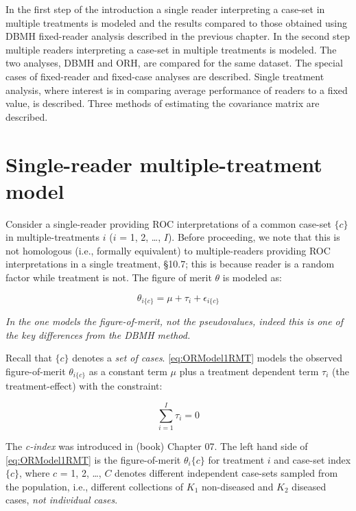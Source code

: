 \documentclass[
]{book}
\begin{document}
In the first step of the introduction a single reader interpreting a case-set in multiple treatments is modeled and the results compared to those obtained using DBMH fixed-reader analysis described in the previous chapter. In the second step multiple readers interpreting a case-set in multiple treatments is modeled. The two analyses, DBMH and ORH, are compared for the same dataset. The special cases of fixed-reader and fixed-case analyses are described. Single treatment analysis, where interest is in comparing average performance of readers to a fixed value, is described. Three methods of estimating the covariance matrix are described.

\hypertarget{OR1RMTModel}{%
\section{Single-reader multiple-treatment model}\label{OR1RMTModel}}

Consider a single-reader providing ROC interpretations of a common case-set \(\{c\}\) in multiple-treatments \(i\) (\(i\) = 1, 2, \ldots, \(I\)). Before proceeding, we note that this is not homologous (i.e., formally equivalent) to multiple-readers providing ROC interpretations in a single treatment, §10.7; this is because reader is a random factor while treatment is not. The figure of merit \(\theta\) is modeled as:

\begin{equation}
\theta_{i\{c\}}=\mu+\tau_i+\epsilon_{i\{c\}}
\label{eq:ORModel1RMT}
\end{equation}

\emph{In the \citep{RN1450} one models the figure-of-merit, not the pseudovalues, indeed this is one of the key differences from the DBMH method.}

Recall that \(\{c\}\) denotes a \emph{set of cases}. \eqref{eq:ORModel1RMT} models the observed figure-of-merit \(\theta_{i\{c\}}\) as a constant term \(\mu\) plus a treatment dependent term \(\tau_i\) (the treatment-effect) with the constraint:

\begin{equation}
\sum_{i=1}^{I}\tau_i=0
\label{eq:ConstraintTau}
\end{equation}

The \emph{c-index} was introduced in (book) Chapter 07. The left hand side of \eqref{eq:ORModel1RMT} is the figure-of-merit \(\theta_i\{c\}\) for treatment \(i\) and case-set index \(\{c\}\), where \(c\) = 1, 2, \ldots, \(C\) denotes different independent case-sets sampled from the population, i.e., different collections of \(K_1\) non-diseased and \(K_2\) diseased cases, \emph{not individual cases}.
\end{document}
